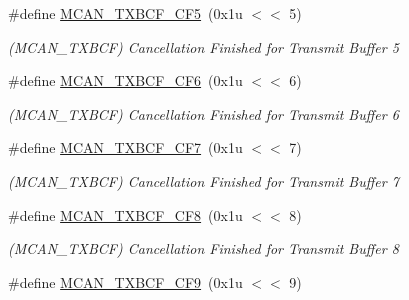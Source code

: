 \begin{DoxyCompactItemize}
\mbox{\label{group__SAME70__MCAN_ga4236938afcc1cd353760d1d7a49a18c0}} 
\#define \mbox{\hyperlink{group__SAME70__MCAN_ga4236938afcc1cd353760d1d7a49a18c0}{M\+C\+A\+N\+\_\+\+T\+X\+B\+C\+F\+\_\+\+C\+F5}}~(0x1u $<$$<$ 5)
\begin{DoxyCompactList}\small\item\em (M\+C\+A\+N\+\_\+\+T\+X\+B\+CF) Cancellation Finished for Transmit Buffer 5 \end{DoxyCompactList}\item 
\mbox{\label{group__SAME70__MCAN_ga18d55d22a7a885401524add3b47b3e42}} 
\#define \mbox{\hyperlink{group__SAME70__MCAN_ga18d55d22a7a885401524add3b47b3e42}{M\+C\+A\+N\+\_\+\+T\+X\+B\+C\+F\+\_\+\+C\+F6}}~(0x1u $<$$<$ 6)
\begin{DoxyCompactList}\small\item\em (M\+C\+A\+N\+\_\+\+T\+X\+B\+CF) Cancellation Finished for Transmit Buffer 6 \end{DoxyCompactList}\item 
\mbox{\label{group__SAME70__MCAN_ga086a7de2f3da77070d8cc2d626b93363}} 
\#define \mbox{\hyperlink{group__SAME70__MCAN_ga086a7de2f3da77070d8cc2d626b93363}{M\+C\+A\+N\+\_\+\+T\+X\+B\+C\+F\+\_\+\+C\+F7}}~(0x1u $<$$<$ 7)
\begin{DoxyCompactList}\small\item\em (M\+C\+A\+N\+\_\+\+T\+X\+B\+CF) Cancellation Finished for Transmit Buffer 7 \end{DoxyCompactList}\item 
\mbox{\label{group__SAME70__MCAN_gafdb3d0ca0f71bca36a62e98b3ce89bdd}} 
\#define \mbox{\hyperlink{group__SAME70__MCAN_gafdb3d0ca0f71bca36a62e98b3ce89bdd}{M\+C\+A\+N\+\_\+\+T\+X\+B\+C\+F\+\_\+\+C\+F8}}~(0x1u $<$$<$ 8)
\begin{DoxyCompactList}\small\item\em (M\+C\+A\+N\+\_\+\+T\+X\+B\+CF) Cancellation Finished for Transmit Buffer 8 \end{DoxyCompactList}\item 
\mbox{\label{group__SAME70__MCAN_gaca230a98302ab0c3300a6fbc30f6cc9d}} 
\#define \mbox{\hyperlink{group__SAME70__MCAN_gaca230a98302ab0c3300a6fbc30f6cc9d}{M\+C\+A\+N\+\_\+\+T\+X\+B\+C\+F\+\_\+\+C\+F9}}~(0x1u $<$$<$ 9)
$$
\end{DoxyCompactItemize}
